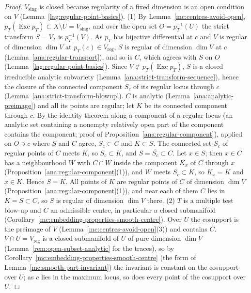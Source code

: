 \begin{proof}
\mixedleanok
\(V_{\mathrm{sing}}\) is closed because regularity of a fixed dimension is an open condition on \(V\) (Lemma~\ref{lag:regular-point-basics}).
(1) By Lemma~\ref{mc:centres-avoid-open}, \(p_T(\operatorname{Exc}p_T)\subset X\setminus U=V_{\mathrm{sing}}\), and over the open set \(O=p_T^{-1}(U)\) the strict transform \(S=V_T\)
is \(p_T^{-1}(V)\). As \(p_T\) has bijective differential at \(c\) and \(V\) is regular of dimension \(\dim V\) at \(p_T(c)\in V_{\mathrm{reg}}\), \(S\) is regular of dimension
\(\dim V\) at \(c\) (Lemma~\ref{ana:regular-transport}), and so is \(C\), which agrees with \(S\) on \(O\) (Lemma~\ref{lag:regular-point-basics}). Since
\(V\not\subset p_T(\operatorname{Exc}p_T)\), \(S\) is a closed irreducible analytic subvariety (Lemma~\ref{ana:strict-transform-sequence}), hence the closure of the
connected component \(S_c\) of its regular locus through \(c\) (Lemma~\ref{ana:strict-transform-blowup}). \(C\) is analytic (Lemma~\ref{ana:analytic-preimage}) and all its
points are regular; let \(K\) be its connected component through \(c\). By the identity theorem along a component of a regular locus (an analytic set containing
a nonempty relatively open part of the component contains the component; proof of Proposition~\ref{ana:regular-component}), applied on \(O\ni c\) where \(S\) and
\(C\) agree, \(S_c\subset C\) and \(K\subset S\). The connected set \(S_c\) of regular points of \(C\) meets \(K\), so \(S_c\subset K\), and \(S=\overline{S_c}\subset C\).
Let \(x\in S\); then \(x\in C\) has a neighbourhood \(W\) with \(C\cap W\) inside the component \(K_x\) of \(C\) through \(x\)
(Proposition~\ref{ana:regular-component}(1)), and \(W\) meets \(S_c\subset K\), so \(K_x=K\) and \(x\in K\). Hence \(S=K\). All points of \(K\) are regular points of \(C\)
of dimension \(\dim V\) (Proposition~\ref{ana:regular-component}(1)), and near each of them \(C\) lies in \(K=S\subset C\), so \(S\) is regular of dimension \(\dim V\) there.
(2) \(T\) is a multiple test blow-up and \(C\) an admissible centre, in particular a closed submanifold (Corollary~\ref{mc:embedding-properties-smooth-centre}).
Over \(U\) the cosupport is the preimage of \(V\) (Lemma~\ref{mc:centres-avoid-open}(3)) and contains \(C\). \(V\cap U=V_{\mathrm{reg}}\) is a closed submanifold of \(U\) of pure
dimension \(\dim V\) (Lemma~\ref{rem:open-subset-analytic} for the traces), so by Corollary~\ref{mc:embedding-properties-smooth-centre} (the form of
Lemma~\ref{mc:smooth-part-invariant}) the invariant is constant on the cosupport over \(U\); as \(c\) lies in the maximum locus, so does every point of the cosupport
over \(U\).
\end{proof}

